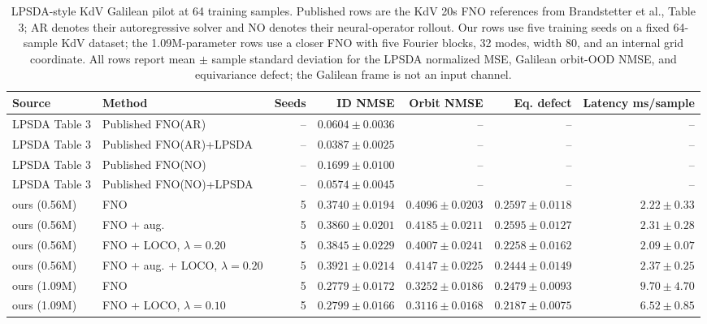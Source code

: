 \begin{table}[t]
\centering
\small
\caption{LPSDA-style KdV Galilean pilot at 64 training samples. Published rows are the KdV 20s FNO references from Brandstetter et al., Table 3; AR denotes their autoregressive solver and NO denotes their neural-operator rollout. Our rows use five training seeds on a fixed 64-sample KdV dataset; the 1.09M-parameter rows use a closer FNO with five Fourier blocks, 32 modes, width 80, and an internal grid coordinate. All rows report mean $\pm$ sample standard deviation for the LPSDA normalized MSE, Galilean orbit-OOD NMSE, and equivariance defect; the Galilean frame is not an input channel.}
\label{tab:lpsda-kdv-galilean-pilot}
\begin{tabular}{llrrrrr}
\toprule
Source & Method & Seeds & ID NMSE & Orbit NMSE & Eq. defect & Latency ms/sample \\
\midrule
LPSDA Table 3 & Published FNO(AR) & -- & \(0.0604\pm0.0036\) & -- & -- & -- \\
LPSDA Table 3 & Published FNO(AR)+LPSDA & -- & \(0.0387\pm0.0025\) & -- & -- & -- \\
LPSDA Table 3 & Published FNO(NO) & -- & \(0.1699\pm0.0100\) & -- & -- & -- \\
LPSDA Table 3 & Published FNO(NO)+LPSDA & -- & \(0.0574\pm0.0045\) & -- & -- & -- \\
ours (0.56M) & FNO & 5 & \(0.3740\pm0.0194\) & \(0.4096\pm0.0203\) & \(0.2597\pm0.0118\) & \(2.22\pm0.33\) \\
ours (0.56M) & FNO + aug. & 5 & \(0.3860\pm0.0201\) & \(0.4185\pm0.0211\) & \(0.2595\pm0.0127\) & \(2.31\pm0.28\) \\
ours (0.56M) & FNO + LOCO, \(\lambda=0.20\) & 5 & \(0.3845\pm0.0229\) & \(0.4007\pm0.0241\) & \(0.2258\pm0.0162\) & \(2.09\pm0.07\) \\
ours (0.56M) & FNO + aug. + LOCO, \(\lambda=0.20\) & 5 & \(0.3921\pm0.0214\) & \(0.4147\pm0.0225\) & \(0.2444\pm0.0149\) & \(2.37\pm0.25\) \\
ours (1.09M) & FNO & 5 & \(0.2779\pm0.0172\) & \(0.3252\pm0.0186\) & \(0.2479\pm0.0093\) & \(9.70\pm4.70\) \\
ours (1.09M) & FNO + LOCO, \(\lambda=0.10\) & 5 & \(0.2799\pm0.0166\) & \(0.3116\pm0.0168\) & \(0.2187\pm0.0075\) & \(6.52\pm0.85\) \\
\bottomrule
\end{tabular}
\end{table}
